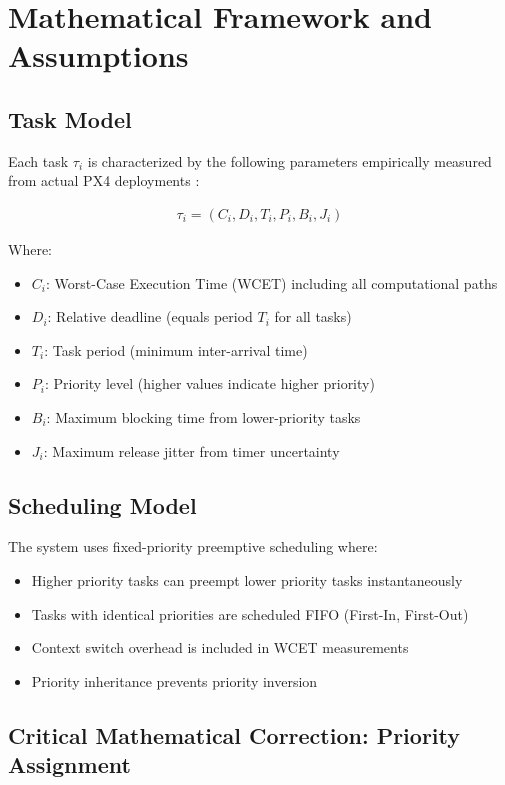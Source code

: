 \documentclass[11pt]{article}
\begin{document}
\section{Mathematical Framework and Assumptions}

\subsection{Task Model}

Each task $\tau_i$ is characterized by the following parameters empirically measured from actual PX4 deployments \cite{px4_wcet_measurements,px4_microbench}:

\begin{align}
\tau_i = (C_i, D_i, T_i, P_i, B_i, J_i)
\end{align}

Where:
\begin{itemize}
    \item $C_i$: Worst-Case Execution Time (WCET) including all computational paths
    \item $D_i$: Relative deadline (equals period $T_i$ for all tasks)
    \item $T_i$: Task period (minimum inter-arrival time)
    \item $P_i$: Priority level (higher values indicate higher priority)
    \item $B_i$: Maximum blocking time from lower-priority tasks
    \item $J_i$: Maximum release jitter from timer uncertainty
\end{itemize}

\subsection{Scheduling Model}

The system uses fixed-priority preemptive scheduling where:
\begin{itemize}
    \item Higher priority tasks can preempt lower priority tasks instantaneously
    \item Tasks with identical priorities are scheduled FIFO (First-In, First-Out)
    \item Context switch overhead is included in WCET measurements
    \item Priority inheritance prevents priority inversion
\end{itemize}

\subsection{Critical Mathematical Correction: Priority Assignment}
\end{document}
